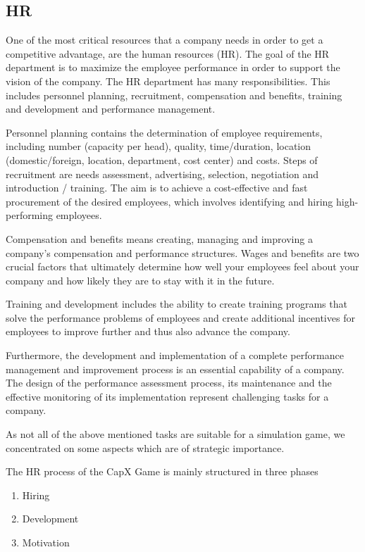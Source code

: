 \subsection{HR} 
\label{HR_manual}
One of the most critical resources that a company needs in order to get a competitive advantage, are the human resources (HR).
The goal of the HR department is to maximize the employee performance in order to support the vision of the company. The HR department has many responsibilities. This includes personnel planning, recruitment, compensation and benefits, training and development and performance management.

Personnel planning contains the determination of employee requirements, including number (capacity per head), quality, time/duration, location (domestic/foreign, location, department, cost center) and costs. Steps of recruitment are needs assessment, advertising, selection, negotiation and introduction / training. The aim is to achieve a cost-effective and fast procurement of the desired employees, which involves identifying and hiring high-performing employees. 

Compensation and benefits means creating, managing and improving a company's compensation and performance structures. Wages and benefits are two crucial factors that ultimately determine how well your employees feel about your company and how likely they are to stay with it in the future.

Training and development includes the ability to create training programs that solve the performance problems of employees and create additional incentives for employees to improve further and thus also advance the company.

Furthermore, the development and implementation of a complete performance management and improvement process is an essential capability of a company. The design of the performance assessment process, its maintenance and the effective monitoring of its implementation represent challenging tasks for a company. 

As not all of the above mentioned tasks are suitable for a simulation game, we concentrated on some aspects which are of strategic importance.

The HR process of the CapX Game is mainly structured in three phases
\begin{enumerate}
    \item Hiring
    \item Development
    \item Motivation
\end{enumerate}

